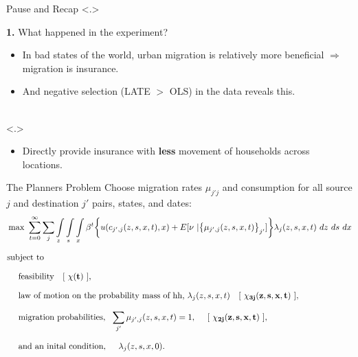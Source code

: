 \documentclass[9pt,pdftex,aspectratio=1610]{beamer}
\theoremstyle{definition}
\begin{document}
\begin{frame}[t]{Pause and Recap}
\uncover<.>{\textbf{1.} What happened in the experiment?
\begin{itemize}
\smallskip
\item In bad states of the world, urban migration is relatively more beneficial $\Rightarrow$ migration is insurance.
\smallskip
\item And negative selection (LATE $>$ OLS) in the data reveals this.
\end{itemize}}
\bigskip
{}
\bigskip
{} \\
\uncover<.>{
\begin{itemize}
\item Directly provide insurance with \textbf{less} movement of households across locations.
\smallskip
\end{itemize}}
\end{frame}


\begin{frame}[t]{The Planners Problem}
Choose migration rates $\mu_{j'j}$ and consumption for all source $j$ and destination $j'$ pairs, states, and dates:\\
\begin{align}
\small
& \max \ \sum_{t=0}^{\infty}\sum_{j} \int\limits_{z} \int\limits_{s} \int\limits_{x} \beta^{t} \bigg \{ u(c_{j',j}(z, s, x, t), x) + E[ \nu \ | \big\{ \mu_{j',j}(z,s,x,t)\big\}_{j'}] \bigg \} \lambda_{j}(z, s, x, t) \ dz \ ds \ dx \nonumber \\[.75em]
& \mbox{subject to} \nonumber\\[.75em]
& \ \ \ \ \mbox{feasibility} \ \ \ [\ \mathbf{\chi(t)} \ ], \nonumber \\[.75em]
& \ \ \ \ \mbox{law of motion on the probability mass of hh,} \ \lambda_j(z, s, x, t) \ \ \ [\ \mathbf{\chi_{3j}(z, s, x, t)} \ ], \nonumber \\[.75em]
& \ \ \ \ \mbox{migration probabilities}, \ \ \sum_{j'} \mu_{j',j}(z, s, x,t) = 1,  \ \ \ \ [\ \mathbf{\chi_{2j}(z, s, x, t)} \ ], \nonumber \\[.75em]
& \ \ \ \ \mbox{and an inital condition}, \ \ \ \ \lambda_j(z, s, x,0). \nonumber
\end{align}
\end{frame}
\end{document}
